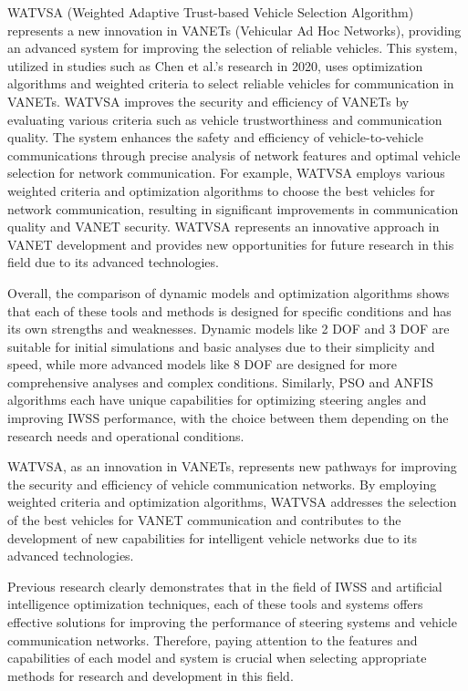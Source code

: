\documentclass[a4paper,10pt]{article}
\begin{document}
        WATVSA (Weighted Adaptive Trust-based Vehicle Selection Algorithm) represents a new innovation in VANETs (Vehicular Ad Hoc Networks), providing an advanced system for improving the selection of reliable vehicles. This system, utilized in studies such as Chen et al.'s research in 2020, uses optimization algorithms and weighted criteria to select reliable vehicles for communication in VANETs. WATVSA improves the security and efficiency of VANETs by evaluating various criteria such as vehicle trustworthiness and communication quality. The system enhances the safety and efficiency of vehicle-to-vehicle communications through precise analysis of network features and optimal vehicle selection for network communication. For example, WATVSA employs various weighted criteria and optimization algorithms to choose the best vehicles for network communication, resulting in significant improvements in communication quality and VANET security. WATVSA represents an innovative approach in VANET development and provides new opportunities for future research in this field due to its advanced technologies.
    
        Overall, the comparison of dynamic models and optimization algorithms shows that each of these tools and methods is designed for specific conditions and has its own strengths and weaknesses. Dynamic models like 2 DOF and 3 DOF are suitable for initial simulations and basic analyses due to their simplicity and speed, while more advanced models like 8 DOF are designed for more comprehensive analyses and complex conditions. Similarly, PSO and ANFIS algorithms each have unique capabilities for optimizing steering angles and improving IWSS performance, with the choice between them depending on the research needs and operational conditions.
    
        WATVSA, as an innovation in VANETs, represents new pathways for improving the security and efficiency of vehicle communication networks. By employing weighted criteria and optimization algorithms, WATVSA addresses the selection of the best vehicles for VANET communication and contributes to the development of new capabilities for intelligent vehicle networks due to its advanced technologies.
    
        Previous research clearly demonstrates that in the field of IWSS and artificial intelligence optimization techniques, each of these tools and systems offers effective solutions for improving the performance of steering systems and vehicle communication networks. Therefore, paying attention to the features and capabilities of each model and system is crucial when selecting appropriate methods for research and development in this field.
\end{document}

